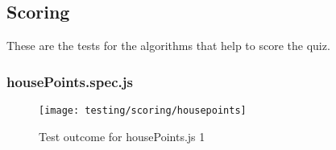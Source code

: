 \subsection{Scoring}
These are the tests for the algorithms that help to score the quiz.

\subsubsection{housePoints.spec.js} %
\label{ssub:housepoints_spec_js}

\begin{figure}[h!]
  \texttt{[image: testing/scoring/housepoints]}
  \caption{Test outcome for housePoints.js 1}
\end{figure}
